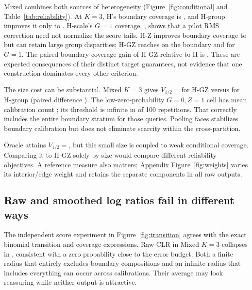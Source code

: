 \documentclass{article}
\begin{document}
Mixed combines both sources of heterogeneity (Figure~\ref{fig:conditional} and Table~\ref{tab:reliability}). At $K=3$, H's boundary coverage is \MixedHBoundary, and H-group improves it only to \MixedGroupBoundary. H-scale's $G=1$ coverage, \MixedHScaleOne, shows that a pilot RMS correction need not normalize the score tails. H-Z improves boundary coverage to \MixedHZBoundary{} but can retain large group disparities; H-GZ reaches \MixedHGZBoundary{} on the boundary and \MixedHGZOne{} for $G=1$. The paired boundary-coverage gain of H-GZ relative to H is \ContrastC. These are expected consequences of their distinct target guarantees, not evidence that one construction dominates every other criterion.

The size cost can be substantial. Mixed $K=3$ gives $V_{1/2}=$\MixedHGZSize for H-GZ versus \MixedGroupSize{} for H-group (paired difference \ContrastG). The low-zero-probability $G=0,Z=1$ cell has mean calibration count \SparseMean; its threshold is infinite in \SparseInfinite{} of 100 repetitions. That correctly includes the entire boundary stratum for those queries. Pooling faces stabilizes boundary calibration but does not eliminate scarcity within the cross-partition.

Oracle attains $V_{1/2}=$\MixedOracleSize, but this small size is coupled to weak conditional coverage. Comparing it to H-GZ solely by size would compare different reliability objectives. A reference measure also matters: Appendix Figure~\ref{fig:weights} varies its interior/edge weight and retains the separate components in all raw outputs.

\begin{table}[t]
\caption{Reliability diagnostics at $K=8$. All entries are mean coverage $\pm$ 95\% interval half-width. H-weight equals H in the exchangeable Mixed setting; under Shift it uses exact density ratios. The oracle density is not weighted under shift.}
\label{tab:reliability}\centering\small\setlength{\tabcolsep}{3pt}

\end{table}

\subsection{Raw and smoothed log ratios fail in different ways}
The independent score experiment in Figure~\ref{fig:transition} agrees with the exact binomial transition and coverage expressions. Raw CLR in Mixed $K=3$ collapses in \MixedCollapse, consistent with a zero probability close to the error budget. Both a finite radius that entirely excludes boundary compositions and an infinite radius that includes everything can occur across calibrations. Their average may look reassuring while neither output is attractive.
\end{document}

